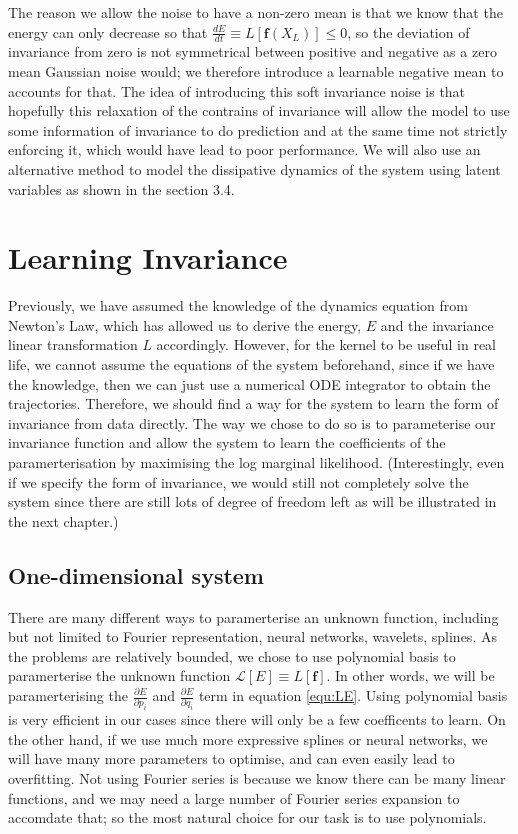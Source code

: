 \documentclass{statsmsc}
\begin{document}
The reason we allow the noise to have a non-zero mean is that we know that the energy can only decrease so that $\frac{dE}{dt}\equiv L[\mathbf{f}(X_L)] \le 0 $, so the deviation of invariance from zero is not symmetrical between positive and negative as a zero mean Gaussian noise would; we therefore introduce a learnable negative mean to accounts for that.  
The idea of introducing this soft invariance noise is that hopefully this relaxation of the contrains of invariance will allow the model to use some information of invariance to do prediction and at the same time not strictly enforcing it, which would have lead to poor performance. 
We will also use an alternative method to model the dissipative dynamics of the system using latent variables as shown in the section 3.4. 


\section{Learning Invariance}
Previously, we have assumed the knowledge of the dynamics equation from Newton's Law, which has allowed us to derive the energy, $E$ and the invariance linear transformation $L$ accordingly. 
However, for the kernel to be useful in real life, we cannot assume the equations of the system beforehand, since if we have the knowledge, then we can just use a numerical ODE integrator to obtain the trajectories. 
Therefore, we should find a way for the system to learn the form of invariance from data directly.
The way we chose to do so is to parameterise our invariance function and allow the system to learn the coefficients of the paramerterisation by maximising the log marginal likelihood.
(Interestingly, even if we specify the form of invariance, we would still not completely solve the system since there are still lots of degree of freedom left as will be illustrated in the next chapter.) 

\subsection{One-dimensional system}
There are many different ways to paramerterise an unknown function, including but not limited to Fourier representation, neural networks, wavelets, splines.
As the problems are relatively bounded, we chose to use polynomial basis to paramerterise the unknown function $\mathcal{L}[E]\equiv L[\mathbf{f}]$.
In other words, we will be paramerterising the $\frac{\partial E}{\partial p_i}$ and $\frac{\partial E}{\partial q_i}$ term in equation \ref{equ:LE}.
Using polynomial basis is very efficient in our cases since there will only be a few coefficents to learn.
On the other hand, if we use much more expressive splines or neural networks, we will have many more parameters to optimise, and can even easily lead to overfitting.
Not using Fourier series is because we know there can be many linear functions, and we may need a large number of Fourier series expansion to accomdate that; so the most natural choice for our task is to use polynomials.
\end{document}
